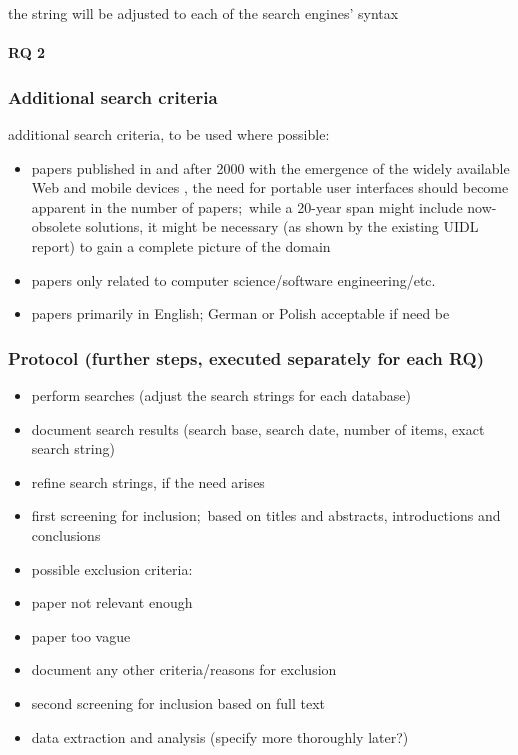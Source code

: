 the string will be adjusted to each of the search engines' syntax

\paragraph{RQ 2}

\subsubsection{Additional search criteria}

additional search criteria, to be used where possible:
\begin{itemize}
    \item papers published in and after 2000 \textendash with the emergence of the widely available Web and mobile devices , the need for portable user interfaces should become apparent in the number of papers;\ while a 20-year span might include now-obsolete solutions, it might be necessary (as shown by the existing UIDL report) to gain a complete picture of the domain
    \item papers only related to computer science/software engineering/etc.
    \item papers primarily in English;
    German or Polish acceptable if need be
\end{itemize}

\subsubsection[Protocol]{Protocol (further steps, executed separately for each RQ)}
\begin{itemize}
    \item perform searches (adjust the search strings for each database)
    \item document search results (search base, search date, number of items, exact search string)
    \item refine search strings, if the need arises
    \item first screening for inclusion;\ based on titles and abstracts, introductions and conclusions
    \item possible exclusion criteria:
    \item paper not relevant enough
    \item paper too vague
    \item document any other criteria/reasons for exclusion
    \item second screening for inclusion based on full text
    \item data extraction and analysis (specify more thoroughly later?)
\end{itemize}
